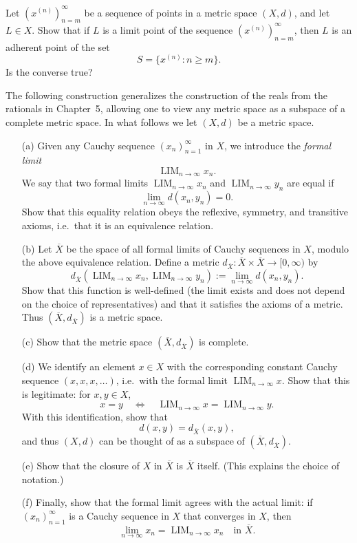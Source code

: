 \begin{problem}
    Let $(x^{(n)})_{n=m}^\infty$ be a sequence of points in a metric space $(X,d)$, and let $L\in X$. Show that if $L$ is a limit point of the sequence $(x^{(n)})_{n=m}^\infty$, then $L$ is an adherent point of the set
\[
S = \{ x^{(n)} : n\ge m \}.
\]
Is the converse true?
\end{problem}

\begin{problem}
    The following construction generalizes the construction of the reals from the rationals in Chapter~5, allowing one to view any metric space as a subspace of a complete metric space. In what follows we let $(X,d)$ be a metric space.
\begin{enumerate}
  \item[(a)] Given any Cauchy sequence $(x_n)_{n=1}^\infty$ in $X$, we introduce the \emph{formal limit} 
  \[
  \operatorname{LIM}_{n\to\infty} x_n.
  \]
  We say that two formal limits $\operatorname{LIM}_{n\to\infty} x_n$ and $\operatorname{LIM}_{n\to\infty} y_n$ are equal if 
  \[
  \lim_{n\to\infty} d(x_n,y_n) = 0.
  \]
  Show that this equality relation obeys the reflexive, symmetry, and transitive axioms, i.e.\ that it is an equivalence relation.

  \item[(b)] Let $\overline{X}$ be the space of all formal limits of Cauchy sequences in $X$, modulo the above equivalence relation. Define a metric $d_{\overline{X}}:\overline{X}\times\overline{X}\to [0,\infty)$ by
  \[
  d_{\overline{X}}\!\left(\operatorname{LIM}_{n\to\infty}x_n, \operatorname{LIM}_{n\to\infty} y_n\right) := \lim_{n\to\infty} d(x_n,y_n).
  \]
  Show that this function is well-defined (the limit exists and does not depend on the choice of representatives) and that it satisfies the axioms of a metric. Thus $(\overline{X},d_{\overline{X}})$ is a metric space.

  \item[(c)] Show that the metric space $(\overline{X},d_{\overline{X}})$ is complete.

  \item[(d)] We identify an element $x\in X$ with the corresponding constant Cauchy sequence $(x,x,x,\dots)$, i.e.\ with the formal limit $\operatorname{LIM}_{n\to\infty} x$. Show that this is legitimate: for $x,y\in X$, 
  \[
  x=y \quad \Longleftrightarrow \quad \operatorname{LIM}_{n\to\infty} x = \operatorname{LIM}_{n\to\infty} y.
  \]
  With this identification, show that 
  \[
  d(x,y) = d_{\overline{X}}(x,y),
  \]
  and thus $(X,d)$ can be thought of as a subspace of $(\overline{X},d_{\overline{X}})$.

  \item[(e)] Show that the closure of $X$ in $\overline{X}$ is $\overline{X}$ itself. (This explains the choice of notation.)

  \item[(f)] Finally, show that the formal limit agrees with the actual limit: if $(x_n)_{n=1}^\infty$ is a Cauchy sequence in $X$ that converges in $X$, then
  \[
  \lim_{n\to\infty} x_n = \operatorname{LIM}_{n\to\infty} x_n \quad \text{in } \overline{X}.
  \]
\end{enumerate}
\end{problem}
